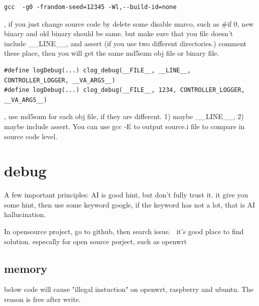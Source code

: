 \documentclass[paper=8.5in:11in, twoside, 12pt, pagesize=pdftex]{book}
\begin{document}
\begin{lstlisting}
gcc  -g0 -frandom-seed=12345 -Wl,--build-id=none
\end{lstlisting}

\par, if you just change source code by delete some disable marco, such as \#if 0, new binary and old binary should be same. but make sure that you file doesn't include \_\_LINE\_\_, and assert (if you use two different directories.) comment these place, then you will get the same md5sum obj file or binary file.
\begin{lstlisting}
#define logDebug(...) clog_debug(__FILE__, __LINE__, CONTROLLER_LOGGER, __VA_ARGS__)
#define logDebug(...) clog_debug(__FILE__, 1234, CONTROLLER_LOGGER, __VA_ARGS__)
\end{lstlisting}

\par, use md5sum for each obj file, if they are different. 1) maybe \_\_LINE\_\_, 2) maybe include assert. You can use gcc -E to output source.i file to compare in source code level.   


\section{debug}
\par A few important principles:
AI is good hint, but don't fully trust it. it give you some hint, then use some keyword google, if the keyword has not a lot, that is AI hallucination.  

\par In opensource project, go to github, then search issue.  it's good place to find solution. especally for open source porject, such as openwrt


\subsection{memory}
below code will cause "illegal instuction" on openwrt, raspberry and ubuntu. The reason is free after write.  
\end{document}

